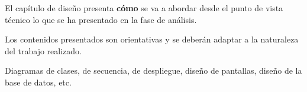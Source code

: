 
El capítulo de diseño presenta \textbf{cómo} se va a abordar desde el punto de vista técnico
lo que se ha presentado en la fase de análisis.

Los contenidos  presentados son orientativas y se deberán adaptar a la
naturaleza del trabajo realizado.

Diagramas de clases, de secuencia, de despliegue, diseño de pantallas,
diseño de la base de datos, etc.